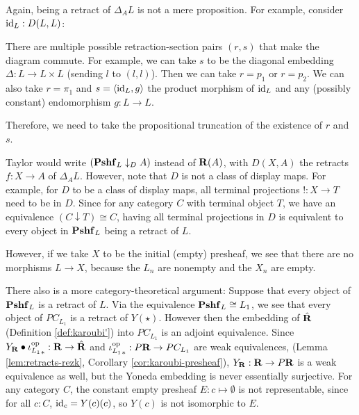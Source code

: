 \begin{remark}
  Again, being a retract of $ \Delta_A L $ is not a mere proposition. For example, consider $ \text{id}_{L} : D(L, L) $:
  \begin{center}
  \end{center}
  There are multiple possible retraction-section pairs $ (r, s) $ that make the diagram commute. For example, we can take $ s $ to be the diagonal embedding $ \Delta : L \to L \times L $ (sending $ l $ to $ (l, l) $). Then we can take $ r = p_1 $ or $ r = p_2 $. We can also take $ r = \pi_1 $ and $ s = \langle \text{id}_{L}, g \rangle $ the product morphism of $ \text{id}_{L} $ and any (possibly constant) endomorphism $ g: L \to L $.

  Therefore, we need to take the propositional truncation of the existence of $ r $ and $ s $.
\end{remark}

\begin{remark}
  Taylor would write $ (\mathbf{Pshf}_{L} \downarrow_D A) $ instead of $ \mathbf{R}(A) $, with $ D(X, A) $ the retracts $ f: X \to A $ of $ \Delta_A L $. However, note that $ D $ is not a class of display maps. For example, for $ D $ to be a class of display maps, all terminal projections $ ! : X \to T $ need to be in $ D $. Since for any category $ C $ with terminal object $ T $, we have an equivalence $ (C \downarrow T) \cong C $, having all terminal projections in $ D $ is equivalent to every object in $ \mathbf{Pshf}_{L} $ being a retract of $ L $.

  However, if we take $ X $ to be the initial (empty) presheaf, we see that there are no morphisms $ L \to X $, because the $ L_n $ are nonempty and the $ X_n $ are empty.

  There also is a more category-theoretical argument: Suppose that every object of $ \mathbf{Pshf}_{L} $ is a retract of $ L $. Via the equivalence $ \mathbf{Pshf}_{L} \cong L_1 $, we see that every object of $ P C_{L_1} $ is a retract of $ Y(\star) $. However then the embedding of $ \hat {\mathbf{R}} $ (Definition \ref{def:karoubi'}) into $ P C_{L_1} $ is an adjoint equivalence. Since $ Y_{\mathbf{R}} \bullet {\ensuremath{\iota_{L_1}^{\text{op}}}}_* : \mathbf{R} \to \hat {\mathbf{R}} $ and $ {\iota_{L_1}^{\text{op}}}_* : P \mathbf{R} \to P C_{L_1} $ are weak equivalences, (Lemma \ref{lem:retracts-rezk}, Corollary \ref{cor:karoubi-presheaf}), $ Y_{\mathbf{R}} : \mathbf{R} \to P \mathbf{R} $ is a weak equivalence as well, but the Yoneda embedding is never essentially surjective. For any category $ C $, the constant empty presheaf $ E: c \mapsto \emptyset $ is not representable, since for all $ c : C $, $ \text{id}_{c} = Y(c)(c) $, so $ Y(c) $ is not isomorphic to $ E $.
\end{remark}

